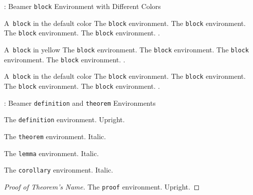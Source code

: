 \begin{frame}{\titleprefix: Beamer \texttt{block} Environment with Different Colors}

	\begin{block}{A~\texttt{block} in the default color}
		The \texttt{block} environment. The \texttt{block} environment. The \texttt{block} environment. The \texttt{block} environment. \insertblocktitle.\strut  %
	\end{block}%

	{%
	\renewcommand{\framedblockcolor}{UBonnYellow}%
	\begin{block}{A~\texttt{block} in yellow}
		The \texttt{block} environment. The \texttt{block} environment. The \texttt{block} environment. The \texttt{block} environment. \insertblocktitle.\strut  %
	\end{block}%
	}

	\begin{block}{A~\texttt{block} in the default color}
		The \texttt{block} environment. The \texttt{block} environment. The \texttt{block} environment. The \texttt{block} environment. \insertblocktitle.\strut  %
	\end{block}%

\end{frame}


\begin{frame}{\titleprefix: Beamer \texttt{definition} and \texttt{theorem} Environments}

	\begin{definition}
		The \texttt{definition} environment. Upright.
	\end{definition}

	\begin{theorem}
		The \texttt{theorem} environment. Italic.
	\end{theorem}%

	\begin{lemma}
		The \texttt{lemma} environment. Italic.
	\end{lemma}%

	\begin{corollary}
		The \texttt{corollary} environment. Italic.
	\end{corollary}%

	\begin{proof}[Proof of Theorem's Name]
		The \texttt{proof} environment. Upright.
	\end{proof}

\end{frame}


